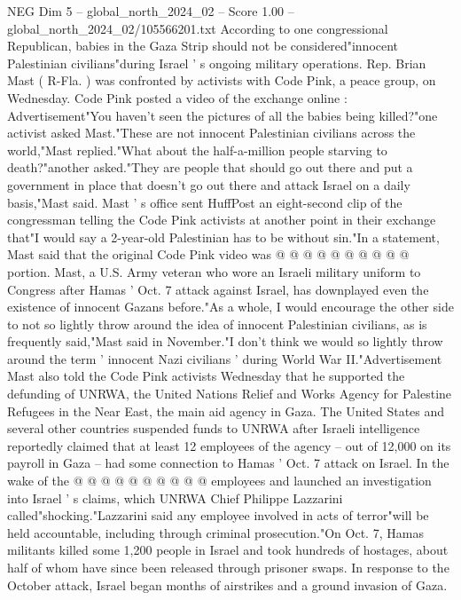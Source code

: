 \begin{textsample}{NEG Dim 5 – global\_north\_2024\_02 – Score 1.00 – global\_north\_2024\_02/105566201.txt}  \label{ex:f5_neg_218}
According to one congressional Republican, babies in the Gaza Strip should not be considered"innocent Palestinian civilians"during Israel ' s ongoing military operations.
Rep.
Brian Mast ( R-Fla. ) was confronted by activists with Code Pink, a peace group, on Wednesday.
Code Pink posted a video of the exchange online : Advertisement"You haven't seen the pictures of all the babies being killed?"one activist asked Mast."These are not innocent Palestinian civilians across the world,"Mast replied."What about the half-a-million people starving to death?"another asked."They are people that should go out there and put a government in place that doesn't go out there and attack Israel on a daily basis,"Mast said.
Mast ' s office sent HuffPost an eight-second clip of the congressman telling the Code Pink activists at another point in their exchange that"I would say a 2-year-old Palestinian has to be without sin."In a statement, Mast said that the original Code Pink video was @ @ @ @ @ @ @ @ @ @ portion.
Mast, a U.S.
Army veteran who wore an Israeli military uniform to Congress after Hamas ' Oct. 7 attack against Israel, has downplayed even the existence of innocent Gazans before."As a whole, I would encourage the other side to not so lightly throw around the idea of innocent Palestinian civilians, as is frequently said,"Mast said in November."I don't think we would so lightly throw around the term ' innocent Nazi civilians ' during World War II."Advertisement Mast also told the Code Pink activists Wednesday that he supported the defunding of UNRWA, the United Nations Relief and Works Agency for Palestine Refugees in the Near East, the main aid agency in Gaza.
The United States and several other countries suspended funds to UNRWA after Israeli intelligence reportedly claimed that at least 12 employees of the agency -- out of 12,000 on its payroll in Gaza -- had some connection to Hamas ' Oct. 7 attack on Israel.
In the wake of the @ @ @ @ @ @ @ @ @ @ employees and launched an investigation into Israel ' s claims, which UNRWA Chief Philippe Lazzarini called"shocking."Lazzarini said any employee involved in acts of terror"will be held accountable, including through criminal prosecution."On Oct. 7, Hamas militants killed some 1,200 people in Israel and took hundreds of hostages, about half of whom have since been released through prisoner swaps.
In response to the October attack, Israel began months of airstrikes and a ground invasion of Gaza.

\end{textsample}
